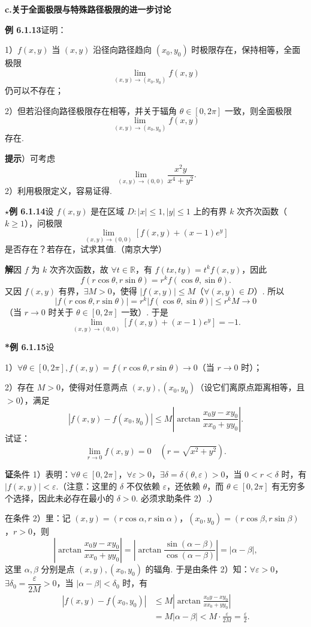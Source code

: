 \documentclass[UTF8, 12pt, fontset=fandol, oneside]{ctexart}
\begin{document}
\noindent\textbf{c.\quad 关于全面极限与特殊路径极限的进一步讨论}

\noindent\textbf{例 6.1.13}\quad 证明：

1）$f(x,y)$ 当 $(x,y)$ 沿径向路径趋向 $(x_0,y_0)$ 时极限存在，保持相等，全面极限
\[
  \lim_{(x,y)\to(x_0,y_0)}f(x,y)
\]
仍可以不存在；

2）但若沿径向路径极限存在相等，并关于辐角 $\theta\in[0,2\pi]$ 一致，则全面极限
\[
  \lim_{(x,y)\to(x_0,y_0)}f(x,y)
\]
存在.

\noindent\textbf{提示}）可考虑
\[
  \lim_{(x,y)\to(0,0)}\frac{x^2y}{x^4+y^2}.
\]
2）利用极限定义，容易证得.

\noindent\textbf{$\star$例 6.1.14}\quad 设 $f(x,y)$ 是在区域 $D:|x|\le1,|y|\le1$ 上的有界 $k$ 次齐次函数（$k\ge1$），问极限
\[
  \lim_{(x,y)\to(0,0)}[f(x,y)+(x-1)e^y]
\]
是否存在？若存在，试求其值.（南京大学）

\noindent\textbf{解}\quad 因 $f$ 为 $k$ 次齐次函数，故 $\forall t\in\mathbb{R}$，有 $f(tx,ty)=t^kf(x,y)$，因此
\[
  f(r\cos\theta,r\sin\theta)=r^kf(\cos\theta,\sin\theta).
\]
又因 $f(x,y)$ 有界，$\exists M>0$，使得 $|f(x,y)|\le M$（$\forall(x,y)\in D$）. 所以
\[
  |f(r\cos\theta,r\sin\theta)|
  =r^k|f(\cos\theta,\sin\theta)|
  \le r^kM\to0
\]
（当 $r\to0$ 时关于 $\theta\in[0,2\pi]$ 一致）.
于是
\[
  \lim_{(x,y)\to(0,0)}[f(x,y)+(x-1)e^y]=-1.
\]

\noindent\textbf{*例 6.1.15}\quad 设

1）$\forall\theta\in[0,2\pi],f(x,y)=f(r\cos\theta,r\sin\theta)\to0$（当 $r\to0$ 时）；

2）存在 $M>0$，使得对任意两点 $(x,y),(x_0,y_0)$（设它们离原点距离相等，且 $>0$），满足
\[
  |f(x,y)-f(x_0,y_0)|
  \le M\left|\arctan\frac{x_0y-xy_0}{xx_0+yy_0}\right|.
\]
试证：
\[
  \lim_{r\to0}f(x,y)=0\quad (r=\sqrt{x^2+y^2}).
\]

\noindent\textbf{证}\quad 条件 1）表明：$\forall\theta\in[0,2\pi]$，$\forall\varepsilon>0$，$\exists\delta=\delta(\theta,\varepsilon)>0$，当 $0<r<\delta$ 时，有 $|f(x,y)|<\varepsilon$.（注意：这里的 $\delta$ 不仅依赖 $\varepsilon$，还依赖 $\theta$，而 $\theta\in[0,2\pi]$ 有无穷多个选择，因此未必存在最小的 $\delta>0$. 必须求助条件 2）.）

在条件 2）里：记 $(x,y)=(r\cos\alpha,r\sin\alpha)$，$(x_0,y_0)=(r\cos\beta,r\sin\beta)$，$r>0$，则
\[
  \left|\arctan\frac{x_0y-xy_0}{xx_0+yy_0}\right|
  =\left|\arctan\frac{\sin(\alpha-\beta)}{\cos(\alpha-\beta)}\right|
  =|\alpha-\beta|,
\]
这里 $\alpha,\beta$ 分别是点 $(x,y),(x_0,y_0)$ 的辐角. 于是由条件 2）知：$\forall\varepsilon>0$，$\exists\delta_0=\dfrac{\varepsilon}{2M}>0$，当 $|\alpha-\beta|<\delta_0$ 时，有
\[
\begin{aligned}
|f(x,y)-f(x_0,y_0)|
&\le M\left|\arctan\frac{x_0y-xy_0}{xx_0+yy_0}\right|\\
&=M|\alpha-\beta|<M\cdot\frac{\varepsilon}{2M}=\frac{\varepsilon}{2}.
\end{aligned}
\tag{1}
\]
\end{document}
